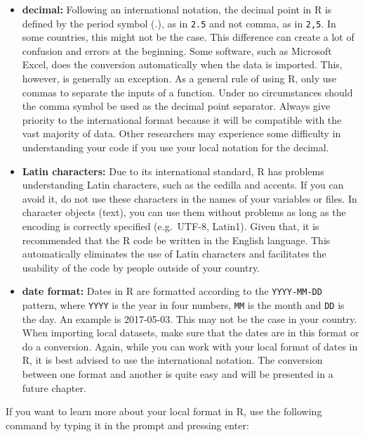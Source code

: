 \documentclass[11pt,]{book}
\begin{document}
\begin{itemize}
\item
  \textbf{decimal:} Following an international notation, the decimal
  point in R is defined by the period symbol (.), as in \texttt{2.5} and
  not comma, as in \texttt{2,5}. In some countries, this might not be
  the case. This difference can create a lot of confusion and errors at
  the beginning. Some software, such as Microsoft Excel, does the
  conversion automatically when the data is imported. This, however, is
  generally an exception. As a general rule of using R, only use commas
  to separate the inputs of a function. Under no circumstances should
  the comma symbol be used as the decimal point separator. Always give
  priority to the international format because it will be compatible
  with the vast majority of data. Other researchers may experience some
  difficulty in understanding your code if you use your local notation
  for the decimal. 
\item
  \textbf{Latin characters:} Due to its international standard, R has
  problems understanding Latin characters, such as the cedilla and
  accents. If you can avoid it, do not use these characters in the names
  of your variables or files. In character objects (text), you can use
  them without problems as long as the encoding is correctly specified
  (e.g.~UTF-8, Latin1). Given that, it is recommended that the R code be
  written in the English language. This automatically eliminates the use
  of Latin characters and facilitates the usability of the code by
  people outside of your country.  
\item
  \textbf{date format:} Dates in R are formatted according to the
  \texttt{YYYY-MM-DD} pattern, where \texttt{YYYY} is the year in four
  numbers, \texttt{MM} is the month and \texttt{DD} is the day. An
  example is 2017-05-03. This may not be the case in your country. When
  importing local datasets, make sure that the dates are in this format
  or do a conversion. Again, while you can work with your local format
  of dates in R, it is best advised to use the international notation.
  The conversion between one format and another is quite easy and will
  be presented in a future chapter. 
\end{itemize}

If you want to learn more about your local format in R, use the
following command by typing it in the prompt and pressing enter:
\end{document}
